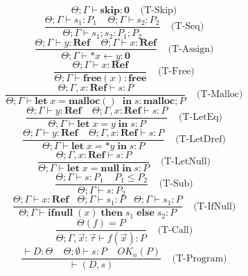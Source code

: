 \documentclass[english]{jssst_ppl} %
\newcommand\LET{\mathbf{let}\;}
\newcommand\IN{\mathbf{in}\;}
\newcommand\SKIP{\mathbf{skip}}
\newcommand\Rtab{\; \; \; \;}
\newcommand\IFNULL{\mathbf{ifnull}\;}
\newcommand\THEN{\mathbf{then}\;}
\newcommand\ELSE{\mathbf{else}\;}
\newcommand\MALLOC{\mathbf{malloc()}\;}
\newcommand\Malloc{\mathbf{malloc}}
\newcommand\Free{\mathbf{free}}
\begin{document}
$$
         \Theta ; \Gamma \vdash \SKIP : \mathbf{0}
      \Rtab \mbox{(T-Skip)}
$$
$$
      \frac{\Theta ; \Gamma \vdash s_{1} : P_{1} \Rtab \Theta ; \Gamma \vdash s_{2} : P_{2}}
          {\Theta ; \Gamma \vdash s_{1} ; s_{2} : P_{1};P_{2} }
     \Rtab \mbox{(T-Seq)}
$$
$$
     \frac{\Theta ; \Gamma \vdash y :  \mathbf{Ref} \Rtab \Theta ; \Gamma \vdash x : \mathbf{Ref} }
          {\Theta ; \Gamma \vdash *x \leftarrow y : \mathbf{0} }
     \Rtab \mbox{(T-Assign)}
$$
$$
     \frac{\Theta ; \Gamma \vdash x : \mathbf{Ref} }
           {\Theta ; \Gamma \vdash \Free(x) : \Free}
     \Rtab \mbox{(T-Free)}
$$
$$
     \frac{\Theta ; \Gamma,x : \mathbf{Ref} \vdash s : P}
           {\Theta ; \Gamma \vdash \LET x = \MALLOC \; \IN s  : \Malloc;P}
           \Rtab \mbox{(T-Malloc)}
$$
$$
     \frac{\Theta ; \Gamma \vdash y : \mathbf{Ref}  \Rtab \Theta ; \Gamma , x : \mathbf{Ref} \vdash s : P}
           {\Theta ; \Gamma \vdash \LET x = y \; \IN s : P}
     \Rtab \mbox{(T-LetEq)}
$$
$$
     \frac{\Theta ; \Gamma \vdash y : \mathbf{Ref}  \Rtab \Theta ; \Gamma , x : \mathbf{Ref} \vdash s : P}
           {\Theta ; \Gamma \vdash \LET x = *y \; \IN s : P}
     \Rtab \mbox{(T-LetDref)}
$$
$$
     \frac{\Theta ; \Gamma, x : \mathbf{Ref} \vdash s : P}
           {\Theta ; \Gamma \vdash \LET x = \mathbf{null} \; \IN s : P}
     \Rtab \mbox{(T-LetNull)}
$$
$$
     \frac{\Theta ; \Gamma \vdash s : P_{1} \Rtab P_{1} \le P_{2}}
            {\Theta ; \Gamma \vdash s : P_{2}}
     \Rtab \mbox{(T-Sub)}
$$
$$
     \frac{\Theta ; \Gamma \vdash x : \mathbf{Ref}   \ \ \ \  \Theta ; \Gamma \vdash s_{1} : P \ \ \ \ \Theta ; \Gamma \vdash s_{1} : P}
           {\Theta ; \Gamma \vdash \IFNULL(x) \; \THEN s_{1}\; \ELSE s_{2} : P}
     \Rtab \mbox{(T-IfNull)}
$$
$$ \frac{ \Theta(f) = P}
{\Theta; \Gamma, \vec{x} : \vec{\tau} \vdash f(\vec{x}) : P}
\Rtab \mbox{(T-Call)} $$
$$\frac{\vdash D : \Theta \;\;\;\; \Theta; \emptyset\vdash s : P \Rtab OK_{n}(P)}
{\vdash (D, s)}
\Rtab \mbox{(T-Program)} $$
\end{document}
